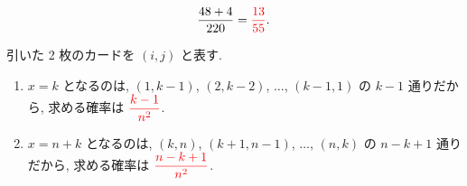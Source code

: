 \begin{qenumerate}
{\begin{enumerate}
{				\begin{align}
					\frac{48 + 4}{220} = \textcolor{red}{\frac{13}{55}}.
				\end{align}
			}
		\end{enumerate}
	}
	\item{
		引いた 2 枚のカードを $(i, j)$ と表す.
		\begin{enumerate}
			\item{
				$x = k$ となるのは, $(1, k - 1)$, $(2, k - 2)$, $\dots$, $(k - 1, 1)$ の $k - 1$ 通りだから, 求める確率は $\textcolor{red}{\dfrac{k - 1}{n^{2}}}$.
			}
			\item{
				$x = n + k$ となるのは, $(k, n)$, $(k + 1, n - 1)$, $\dots$, $(n, k)$ の $n - k + 1$ 通りだから, 求める確率は $\textcolor{red}{\dfrac{n - k + 1}{n^{2}}}$.
			}
		\end{enumerate}
	}
\end{qenumerate}

